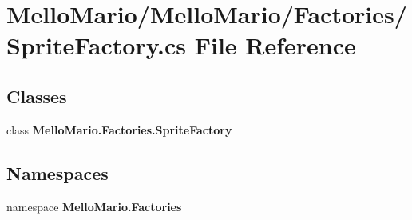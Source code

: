 \section{Mello\+Mario/\+Mello\+Mario/\+Factories/\+Sprite\+Factory.cs File Reference}
\label{SpriteFactory_8cs}
\subsection*{Classes}
\begin{DoxyCompactItemize}
\item 
class \textbf{ Mello\+Mario.\+Factories.\+Sprite\+Factory}
\end{DoxyCompactItemize}
\subsection*{Namespaces}
\begin{DoxyCompactItemize}
\item 
namespace \textbf{ Mello\+Mario.\+Factories}
\end{DoxyCompactItemize}
